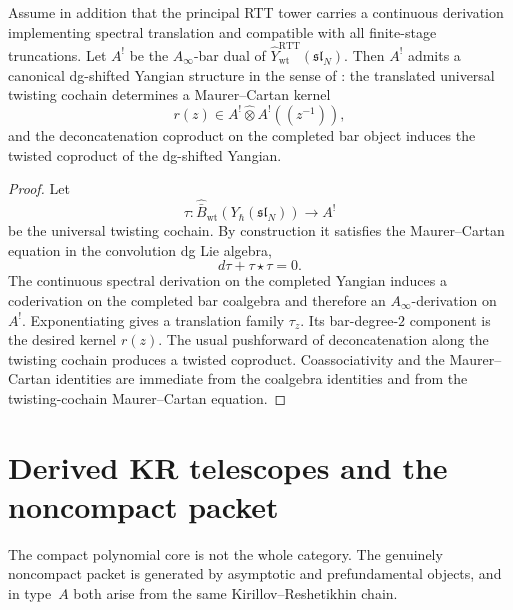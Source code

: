\begin{theorem}
\ClaimStatusProvedHere
\label{thm:recognition-completed-dg-shifted-yangian}
Assume in addition that the principal RTT tower carries a continuous
derivation implementing spectral translation and compatible with all
finite-stage truncations. Let $A^!$ be the $A_\infty$-bar dual of
$\widehat Y^{\mathrm{RTT}}_{\mathrm{wt}}(\mathfrak{sl}_N)$. Then $A^!$
admits a canonical dg-shifted Yangian structure in the sense of
\cite{DNP25}: the translated universal twisting cochain determines a
Maurer--Cartan kernel
\begin{equation}
r(z)\in A^!\widehat\otimes A^!((z^{-1})),
\end{equation}
and the deconcatenation coproduct on the completed bar object induces the
twisted coproduct of the dg-shifted Yangian.
\end{theorem}

\begin{proof}
Let
\begin{equation}
\tau:\widehat{\bar B}_{\mathrm{wt}}(Y_\hbar(\mathfrak{sl}_N))\to A^!
\end{equation}
be the universal twisting cochain. By construction it satisfies the
Maurer--Cartan equation in the convolution dg Lie algebra,
\begin{equation}
d\tau+\tau\star\tau=0.
\end{equation}
The continuous spectral derivation on the completed Yangian induces a
coderivation on the completed bar coalgebra and therefore an
$A_\infty$-derivation on $A^!$. Exponentiating gives a translation family
$\tau_z$. Its bar-degree-$2$ component is the desired kernel $r(z)$. The
usual pushforward of deconcatenation along the twisting cochain produces a
twisted coproduct. Coassociativity and the Maurer--Cartan identities are
immediate from the coalgebra identities and from the twisting-cochain
Maurer--Cartan equation.
\end{proof}

\section{Derived KR telescopes and the noncompact packet}
\label{sec:typeA-derived-KR-telescopes}

The compact polynomial core is not the whole category. The genuinely
noncompact packet is generated by asymptotic and prefundamental objects,
and in type~$A$ both arise from the same Kirillov--Reshetikhin chain.

